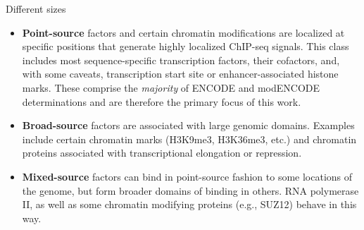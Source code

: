 \documentclass{beamer}
\begin{document}
\begin{frame}
\end{frame}

\begin{frame}{Different sizes}
\begin{itemize}
\item \textbf{Point-source} factors and certain chromatin modifications are localized at specific positions that generate highly localized ChIP-seq signals. This class includes most sequence-specific transcription factors, their cofactors, and, with some caveats, transcription start site or enhancer-associated histone marks. These comprise the \textit{majority} of ENCODE and modENCODE determinations and are therefore the primary focus of this work.
\item \textbf{Broad-source} factors are associated with large genomic domains. Examples include certain chromatin marks (H3K9me3, H3K36me3, etc.) and chromatin proteins associated with transcriptional elongation or repression.
\item \textbf{Mixed-source} factors can bind in point-source fashion to some locations of the genome, but form broader domains of binding in others. RNA polymerase II, as well as some chromatin modifying proteins (e.g., SUZ12) behave in this way.
\end{itemize}
\end{frame}
\end{document}

